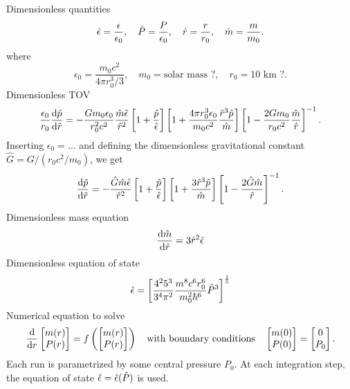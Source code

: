 Dimensionless quantities
\begin{equation}
	\hat{\epsilon} = \frac{\epsilon}{\epsilon_0}, \quad
	\hat{P} = \frac{P}{\epsilon_0}, \quad
	\hat{r} = \frac{r}{r_0}, \quad
	\hat{m} = \frac{m}{m_0}.
\end{equation}
where
\begin{equation}
	\epsilon_0 = \frac{m_0 c^2}{4 \pi r_0^3 / 3}, \quad
	m_0 = \text{solar mass ?}, \quad
	r_0 = \text{10 km ?}.
\end{equation}
Dimensionless TOV
\begin{equation}
	\frac{\epsilon_0}{r_0} \odv{\diml{p}}{\diml{r}} = -\frac{G m_0 \epsilon_0}{r_0^2 c^2} \frac{\diml{m} \diml{\epsilon}}{\diml{r}^2} \left[ 1 + \frac{\diml{p}}{\diml{\epsilon}} \right] \left[ 1 + \frac{4 \pi r_0^3 \epsilon_0}{m_0 c^2} \frac{\diml{r}^3 \diml{p}}{\diml{m}} \right] \left[ 1 - \frac{2 G m_0}{r_0 c^2} \frac{\diml{m}}{\diml{r}} \right]^{-1}.
\end{equation}
Inserting $\epsilon_0 = \ldots$ and defining the dimensionless gravitational constant $\hat{G} = G / (r_0 c^2 / m_0)$, we get
\begin{equation}
	\odv{\diml{p}}{\diml{r}} = - \frac{\diml{G} \diml{m} \diml{\epsilon}}{\diml{r}^2} \left[ 1 + \frac{\diml{p}}{\diml{\epsilon}} \right] \left[ 1 + \frac{3 \diml{r}^3 \diml{p}}{\diml{m}} \right] \left[ 1 - \frac{2 \diml{G} \diml{m}}{\diml{r}} \right]^{-1}.
\end{equation}
Dimensionless mass equation
\begin{equation}
	\odv{\diml{m}}{\diml{r}} = 3 \diml{r}^2 \diml{\epsilon}
\end{equation}
Dimensionless equation of state
\begin{equation}
	\hat{\epsilon} = \left[ \frac{4^2 5^3}{3^4 \pi^2} \frac{m^8 c^6 r_0^6}{m_0^2 \hbar^6} \hat{P}^3 \right]^{\frac{1}{5}}
\end{equation}
Numerical equation to solve
\begin{equation}
	\odv{}{r} \begin{bmatrix} m(r) \\ P(r) \\ \end{bmatrix} = f \left( \begin{bmatrix} m(r) \\ P(r) \\ \end{bmatrix} \right)
	\quad \text{with boundary conditions} \quad
	\begin{bmatrix} m(0) \\ P(0) \\ \end{bmatrix} = \begin{bmatrix} 0 \\ P_0 \\ \end{bmatrix}.
\end{equation}
Each run is parametrized by some central pressure $P_0$.
At each integration step, the equation of state $\hat{\epsilon} = \hat{\epsilon}(\hat{P})$ is used.

